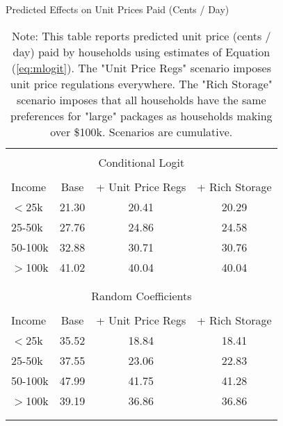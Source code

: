 \begin{table}[!htbp] \centering
\caption{Predicted Effects on Unit Prices Paid (Cents / Day)}
\label{tab:counterfactualMNLPrice}
\begin{tabular}{lccc}
\\[-1.8ex]\hline
\hline \\[-1.8ex]
\multicolumn{4}{c}{\small Conditional Logit} \\
\hline \\[-1.8ex]
Income   & Base    & + Unit Price Regs   &  + Rich Storage  \\
\hline
$<$25k     & 21.30   & 20.41              & 20.29 \\
25-50k   & 27.76   & 24.86              & 24.58 \\
50-100k  & 32.88   & 30.71              & 30.76 \\
$>$100k    & 41.02   & 40.04              & 40.04 \\
\\[-1.8ex]\hline
\hline \\[-1.8ex]
\multicolumn{4}{c}{\small Random Coefficients} \\
\hline \\[-1.8ex]
Income   & Base    & + Unit Price Regs   &  + Rich Storage  \\
\hline
$<$25k     & 35.52   & 18.84              & 18.41 \\
25-50k   & 37.55   & 23.06              & 22.83 \\
50-100k  & 47.99   & 41.75              & 41.28 \\
$>$100k    & 39.19   & 36.86              & 36.86 \\
\\[-1.8ex]\hline
\hline \\[-1.8ex]
\end{tabular}
\caption*{Note: This table reports predicted unit price (cents / day) paid by households using estimates of Equation (\ref{eq:mlogit}). The "Unit Price Regs" scenario imposes unit price regulations everywhere. The "Rich Storage" scenario imposes that all households have the same preferences for "large" packages as households making over \$100k. Scenarios are cumulative.}
\end{table}
